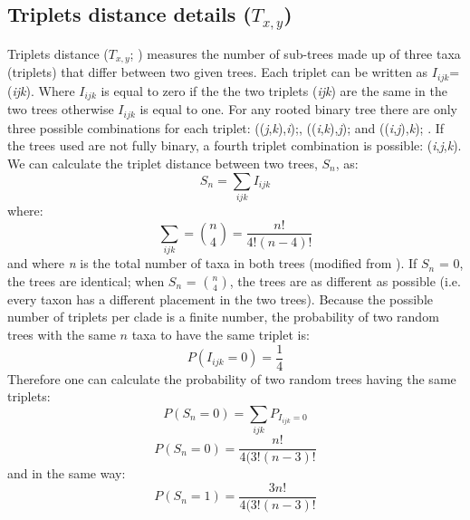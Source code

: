 \subsection{Triplets distance details ($T_{x,y}$)}
Triplets distance ($T_{x,y}$; \citealp{dobson1975triplets}) measures the number of sub-trees made up of three taxa (triplets) that differ between two given trees. Each triplet can be written as $I_{ijk}$=(\textit{ijk}). Where $I_{ijk}$ is equal to zero if the the two triplets (\textit{ijk}) are the same in the two trees otherwise $I_{ijk}$ is equal to one. For any rooted binary tree there are only three possible combinations for each triplet: ((\textit{j},\textit{k}),\textit{i});, ((\textit{i},\textit{k}),\textit{j}); and ((\textit{i},\textit{j}),\textit{k}); \citep{johnson1998}. If the trees used are not fully binary, a fourth triplet combination is possible: (\textit{i},\textit{j},\textit{k}). We can calculate the triplet distance between two trees, $S_n$, as:
\begin{equation}
S_n = \sum_{ijk} I_{ijk}
\end{equation}
where:
\begin{equation}
\sum_{ijk} = \binom{n}{4} = \frac{n!}{4!(n-4)!}
\end{equation}
and where \textit{n} is the total number of taxa in both trees (modified from \citet{critchlowthe1996}). If $S_n$ = 0, the trees are identical; when $S_n$ = $\binom{n}{4}$, the trees are as different as possible (i.e. every taxon has a different placement in the two trees). Because the possible number of triplets per clade is a finite number, the probability of two random trees with the same $n$ taxa to have the same triplet is:
\begin{equation}
P({I_{ijk}}=0) = \frac{1}{4}
\end{equation}
Therefore one can calculate the probability of two random trees having the same triplets: 
\begin{equation}
P({S_{n}}=0) = \sum_{ijk} P_{I_{ijk}=0}
\end{equation}
\begin{equation}
P({S_{n}}=0) = \frac{n!}{4(3!(n-3)!}
\end{equation}
and in the same way:
\begin{equation}
P({S_{n}}=1) = \frac{3n!}{4(3!(n-3)!}
\end{equation}

